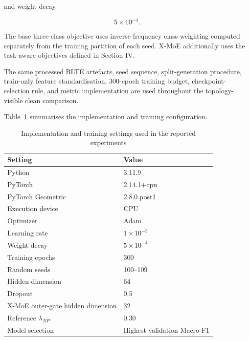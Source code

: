 \documentclass{ieeeaccess}
\begin{document}
and weight decay

\begin{equation}
5\times10^{-4}.
\end{equation}

The base three-class objective uses inverse-frequency class weighting computed separately from the training partition of each seed. X-MoE additionally uses the task-aware objectives defined in Section IV.

The same processed BLTE artefacts, seed sequence, split-generation procedure, train-only feature standardisation, 300-epoch training budget, checkpoint-selection rule, and metric implementation are used throughout the topology-visible clean comparison.

Table~\ref{tab:implementation_settings} summarises the implementation and training configuration.

\begin{table}[t]
\centering
\caption{Implementation and training settings used in the reported experiments}
\label{tab:implementation_settings}

\renewcommand{\arraystretch}{1.12}
\setlength{\tabcolsep}{5pt}
\scriptsize

\begin{tabular}{ll}
\toprule
\textbf{Setting} & \textbf{Value} \\
\midrule

Python & 3.11.9 \\
PyTorch & 2.14.1+cpu \\
PyTorch Geometric & 2.8.0.post1 \\
Execution device & CPU \\
Optimizer & Adam \\
Learning rate & $1\times10^{-3}$ \\
Weight decay & $5\times10^{-4}$ \\
Training epochs & 300 \\
Random seeds & 100--109 \\
Hidden dimension & 64 \\
Dropout & 0.5 \\
X-MoE outer-gate hidden dimension & 32 \\
Reference $\lambda_{NP}$ & 0.30 \\
Model selection & Highest validation Macro-F1 \\

\bottomrule
\end{tabular}
\end{table}
\end{document}
